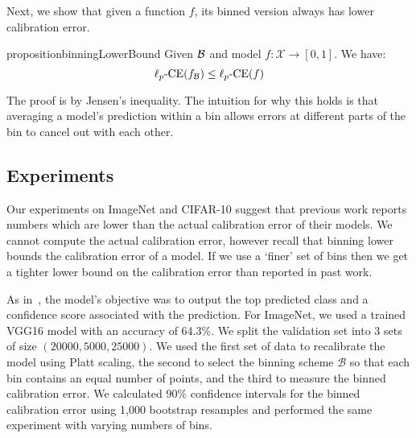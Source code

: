 Next, we show that given a function $f$, its binned version always has lower calibration error.



\begin{restatable}{proposition}{binningLowerBound}
\label{prop:bin_low_bound}
  Given  $\mathcal{B}{}$ and model $f : \mathcal{X} \to [0, 1]$. We have:
\[  \ell_p\mbox{-CE}(f_{\mathcal{B}{}}) \leq \ell_p\mbox{-CE}(f) \]
\end{restatable}

The proof is by Jensen's inequality. The intuition for why this holds is that  averaging a model's prediction within a bin allows errors at different parts of the bin to cancel out with each other. 

\subsection{Experiments}

Our experiments on ImageNet and CIFAR-10 suggest that previous work reports numbers which are lower than the actual calibration error of their models. We cannot compute the actual calibration error, however recall that  binning lower bounds the calibration error of a model. If we use a `finer' set of bins then we get a tighter lower bound on the calibration error than reported in past work.

As in~\cite{guo2017calibration}, the model's objective was to output the top predicted class and a confidence score associated with the prediction. For ImageNet, we used a trained VGG16 model with an accuracy of 64.3\%. We split the validation set into 3 sets of size $(20000, 5000, 25000)$. We used the first set of data to recalibrate the model using Platt scaling, the second to select the binning scheme $\mathcal{B}$ so that each bin contains an equal number of points, and the third to measure the binned calibration error. We calculated $90\%$ confidence intervals for the binned calibration error using 1,000 bootstrap resamples and performed the same experiment with varying numbers of bins.


